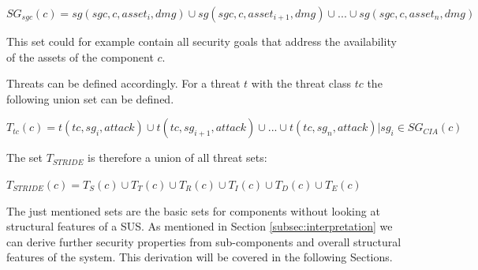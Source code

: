 \begin{theorem}
$SG_{sgc}(c) = sg(sgc, c, asset_i, dmg) \cup sg(sgc, c, asset_{i+1}, dmg)  \cup ... \cup sg(sgc, c, asset_n, dmg) $
\end{theorem}

This set could for example contain all security goals that address the availability of the assets of the component $c$.

%
% 
%
%
%

Threats can be defined accordingly. For a threat $t$ with the threat class $tc$ the following union set can be defined. 

\begin{theorem} 
$T_{tc}(c) = t(tc, sg_i, attack) \cup t(tc, sg_{i+1}, attack) \cup ... \cup t(tc, sg_n, attack) | sg_i \in SG_{CIA}(c)$
\end{theorem}

The set $T_{STRIDE}$ is therefore a union of all threat sets:

\begin{theorem} 
$T_{STRIDE}(c) = T_S(c) \cup T_T(c) \cup T_R(c) \cup T_I(c) \cup T_D(c) \cup T_E(c)$
\end{theorem}

The just mentioned sets are the basic sets for components without looking at structural features of a SUS. As mentioned in Section \ref{subsec:interpretation} we can derive further security properties from sub-components and overall structural features of the system. This derivation will be covered in the following Sections.

